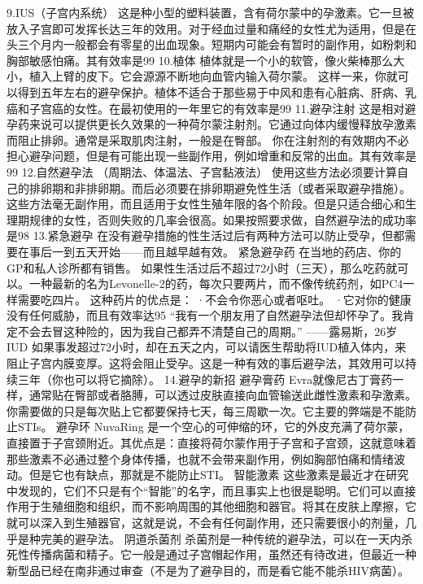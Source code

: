 \documentclass[12pt,UTF8,openany]{ctexbook}
\begin{document}
9.IUS（子宫内系统）
这是种小型的塑料装置，含有荷尔蒙中的孕激素。它一旦被放入子宫即可发挥长达三年的效用。对于经血过量和痛经的女性尤为适用，但是在头三个月内一般都会有零星的出血现象。短期内可能会有暂时的副作用，如粉刺和胸部敏感怕痛。其有效率是99%
10.植体
植体就是一个小的软管，像火柴棒那么大小，植入上臂的皮下。它会源源不断地向血管内输入荷尔蒙。
这样一来，你就可以得到五年左右的避孕保护。植体不适合于那些易于中风和患有心脏病、肝病、乳癌和子宫癌的女性。在最初使用的一年里它的有效率是99%
11.避孕注射
这是相对避孕药来说可以提供更长久效果的一种荷尔蒙注射剂。它通过向体内缓慢释放孕激素而阻止排卵。通常是采取肌肉注射，一般是在臀部。
你在注射剂的有效期内不必担心避孕问题，但是有可能出现一些副作用，例如增重和反常的出血。其有效率是99%
12.自然避孕法
（周期法、体温法、子宫黏液法）
使用这些方法必须要计算自己的排卵期和非排卵期。而后必须要在排卵期避免性生活（或者采取避孕措施）。这些方法毫无副作用，而且适用于女性生殖年限的各个阶段。但是只适合细心和生理期规律的女性，否则失败的几率会很高。如果按照要求做，自然避孕法的成功率是98%
13.紧急避孕
在没有避孕措施的性生活过后有两种方法可以防止受孕，但都需要在事后一到五天开始——而且越早越有效。
紧急避孕药
在当地的药店、你的GP和私人诊所都有销售。
如果性生活过后不超过72小时（三天），那么吃药就可以。一种最新的名为Levonelle-2的药，每次只要两片，而不像传统药剂，如PC4一样需要吃四片。
这种药片的优点是：
·不会令你恶心或者呕吐。
·它对你的健康没有任何威胁，而且有效率达95%
“我有一个朋友用了自然避孕法但却怀孕了。我肯定不会去冒这种险的，因为我自己都弄不清楚自己的周期。”
——露易斯，26岁
IUD
如果事发超过72小时，却在五天之内，可以请医生帮助将IUD植入体内，来阻止子宫内膜变厚。这将会阻止受孕。这是一种有效的事后避孕法，其效用可以持续三年（你也可以将它摘除）。
14.避孕的新招
避孕膏药
Evra就像尼古丁膏药一样，通常贴在臀部或者胳膊，可以透过皮肤直接向血管输送此雌性激素和孕激素。
你需要做的只是每次贴上它都要保持七天，每三周歇一次。它主要的弊端是不能防止STIs。
避孕环
NuvaRing 是一个空心的可伸缩的环，它的外皮充满了荷尔蒙，直接置于子宫颈附近。其优点是：直接将荷尔蒙作用于子宫和子宫颈，这就意味着那些激素不必通过整个身体传播，也就不会带来副作用，例如胸部怕痛和情绪波动。但是它也有缺点，那就是不能防止STI。
智能激素
这些激素是最近才在研究中发现的，它们不只是有个“智能”的名字，而且事实上也很是聪明。它们可以直接作用于生殖细胞和组织，而不影响周围的其他细胞和器官。将其在皮肤上摩擦，它就可以深入到生殖器官，这就是说，不会有任何副作用，还只需要很小的剂量，几乎是种完美的避孕法。
阴道杀菌剂
杀菌剂是一种传统的避孕法，可以在一天内杀死性传播病菌和精子。它一般是通过子宫帽起作用，虽然还有待改进，但最近一种新型品已经在南非通过审查（不是为了避孕目的，而是看它能不能杀HIV病菌）。
\end{document}
